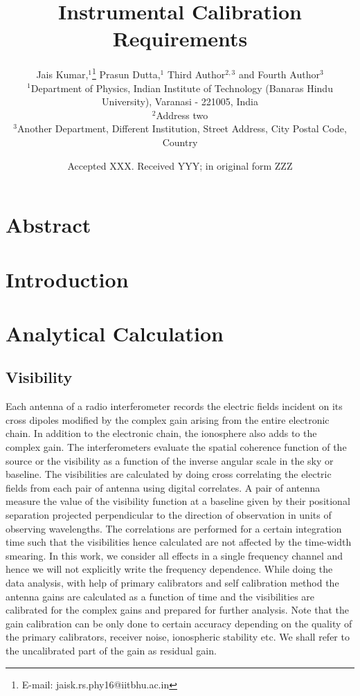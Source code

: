 \documentclass[fleqn,usenatbib]{mnras}
\title{Instrumental Calibration Requirements}
\author[Kumar and Dutta]{Jais Kumar,$^{1}$\thanks{E-mail: jaisk.rs.phy16@iitbhu.ac.in}
Prasun Dutta,$^{1}$
Third Author$^{2,3}$
and Fourth Author$^{3}$
\\
$^{1}$Department of Physics, Indian Institute of Technology (Banaras Hindu University), Varanasi - 221005, India\\
$^{2}$Address two\\
$^{3}$Another Department, Different Institution, Street Address, City Postal Code, Country
}
\date{Accepted XXX. Received YYY; in original form ZZZ}
\begin{document}
\label{firstpage}
\pagerange{\pageref{firstpage}--\pageref{lastpage}}
\maketitle

\section{Abstract}

\section{Introduction}

\section{Analytical Calculation}
\subsection{Visibility}
Each antenna of a radio interferometer records the electric fields incident on its cross dipoles modified by the complex gain arising from the entire electronic chain. In addition to the electronic chain, the ionosphere also adds to the complex gain. The interferometers evaluate the spatial coherence function of the source or the visibility as a function of the inverse angular scale in the sky or baseline.  The visibilities are calculated by doing cross correlating the electric fields from each pair of antenna using digital correlates. A pair of antenna measure the value of the visibility function at a baseline given by their positional separation projected perpendicular to the direction of observation in units of observing wavelengths. The correlations are performed for a certain integration time such that the visibilities hence calculated are not affected by the time-width smearing. In this work, we consider all effects in a single frequency channel and hence we will not explicitly write the frequency dependence. While doing the data analysis, with help of primary calibrators and self calibration method the antenna gains are calculated as a function of time and the visibilities are calibrated for the complex gains and prepared for further analysis. Note that the gain calibration can be only done to certain accuracy depending on the quality of the primary calibrators, receiver noise, ionospheric stability etc. We shall refer to the uncalibrated part of the gain as residual gain.
\end{document}
